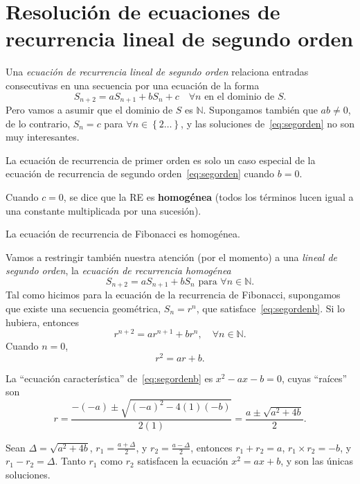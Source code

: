 \section{Resolución de ecuaciones de recurrencia lineal de segundo orden}

Una \emph{ecuación de recurrencia lineal de segundo orden} relaciona entradas consecutivas en una secuencia por una ecuación de la forma
\begin{equation}\label{eq:segordena}
	S_{n+2}=aS_{n+1}+bS_{n}+c\quad\forall n\text{ en el dominio de }S.
\end{equation}
Pero vamos a asumir que el dominio de $S$ es $\mathds{N}$. Supongamos también que $ab\neq0$, de lo contrario, $S_{n}=c$ para $\forall n\in\left\{2\ldots\right\}$, y las soluciones de~\eqref{eq:segorden} no son muy interesantes.

\begin{remark}
	La ecuación de recurrencia de primer orden es solo un caso especial de la ecuación de recurrencia de segundo orden~\eqref{eq:segorden} cuando $b=0$.
\end{remark}

Cuando $c=0$, se dice que la RE es \textbf{homogénea} (todos los términos lucen igual a una constante multiplicada por una sucesión).

\begin{remark}
	La ecuación de recurrencia de Fibonacci es homogénea.
\end{remark}

Vamos a restringir también nuestra atención (por el momento) a una \emph{lineal de segundo orden}, la \emph{ecuación de recurrencia homogénea}
\begin{equation}\label{eq:segordenb}
	S_{n+2}=aS_{n+1}+bS_{n}\text{ para }\forall n\in\mathds{N}.
\end{equation}
Tal como hicimos para la ecuación de la recurrencia de Fibonacci, supongamos que existe una secuencia geométrica, $S_{n}=r^{n}$, que satisface~\eqref{eq:segordenb}. Si lo hubiera, entonces \[ r^{n+2}=ar^{n+1}+br^{n},\quad\forall n\in\mathds{N}. \] Cuando $n=0$, \[ r^{2}=ar+b. \]

La ``ecuación característica'' de~\eqref{eq:segordenb} es $x^2-ax-b=0$, cuyas ``raíces'' son \[ r=\frac{-\left(-a\right)\pm\sqrt{{\left(-a\right)}^{2}-4\left(1\right)\left(-b\right)}}{2\left(1\right)}=\frac{a\pm\sqrt{a^{2}+4b}}{2}. \]

Sean $\Delta=\sqrt{a^2+4b}$, $r_1=\frac{a+\Delta}{2}$, y $r_2=\frac{a-\Delta}{2}$, entonces $r_{1}+r_{2}=a$, $r_{1}\times r_{2}=-b$, y $r_{1}-r_{2}=\Delta$. Tanto $r_{1}$ como $r_{2}$ satisfacen la ecuación $x^{2}=ax+b$, y son las únicas soluciones.

